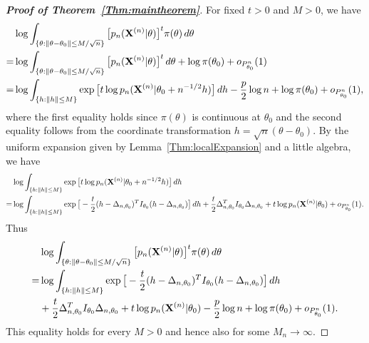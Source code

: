 \documentclass[11pt]{article}
\theoremstyle{plain}
\theoremstyle{definition}
\theoremstyle{remark}
\begin{document}
\begin{appendices}
    \begin{proof}[\textbf{Proof of Theorem~\ref{Thm:maintheorem}}]
        For fixed $t>0$ and $M>0$, we have
\begin{align*}
    &\log \int_{\{\theta:\|\theta-\theta_0\|\leq M/\sqrt{n}\}}\big[ p_n(\mathbf{X}^{(n)}|\theta)\big]^t \pi(\theta)\, d\theta\\
    =
    &\log \int_{\{\theta:\|\theta-\theta_0\|\leq M/\sqrt{n}\}}\big[ p_n(\mathbf{X}^{(n)}|\theta)\big]^t \, d\theta+\log \pi(\theta_0)+o_{P^n_{\theta_0}}(1)\\
    =
    &\log \int_{\{h:\|h\|\leq M\}}\exp\big[ t\log p_n(\mathbf{X}^{(n)}|\theta_0+n^{-1/2}h)\big] \, dh-\frac{p}{2}\log n+\log \pi(\theta_0)+o_{P^n_{\theta_0}}(1),
\end{align*}
where the first equality holds since $\pi(\theta)$ is continuous at $\theta_0$ and the second equality follows from the coordinate transformation $h=\sqrt{n}(\theta-\theta_0)$.
By the uniform expansion given by Lemma~\ref{Thm:localExpansion} and a little algebra, we have
\begin{align*}
    &\log \int_{\{h:\|h\|\leq M\}}\exp\big[ t\log p_n(\mathbf{X}^{(n)}|\theta_0+n^{-1/2}h)\big] \, dh\\
    =&\log \int_{\{h:\|h\|\leq M\}}\exp\big[ -\frac{t}{2}(h-\Delta_{n,\theta_0})^T I_{\theta_0}(h-\Delta_{n,\theta_0})\big] \, dh
    +
    \frac{t}{2}\Delta_{n,\theta_0}^T I_{\theta_0}\Delta_{n,\theta_0}
    +
    t\log p_n(\mathbf{X}^{(n)}|\theta_0)
    +o_{P_{\theta_0}^n}(1).
\end{align*}
        Thus
\begin{align*}
    &\log \int_{\{\theta:\|\theta-\theta_0\|\leq M/\sqrt{n}\}}\big[ p_n(\mathbf{X}^{(n)}|\theta)\big]^t \pi(\theta)\, d\theta\\
    =
    &\log \int_{\{h:\|h\|\leq M\}}\exp\big[ -\frac{t}{2}(h-\Delta_{n,\theta_0})^T I_{\theta_0}(h-\Delta_{n,\theta_0})\big] \, dh
    \\
    & +
    \frac{t}{2}\Delta_{n,\theta_0}^T I_{\theta_0}\Delta_{n,\theta_0}
    +
    t\log p_n(\mathbf{X}^{(n)}|\theta_0)
    -\frac{p}{2}\log n+\log \pi(\theta_0)+o_{P^n_{\theta_0}}(1).
\end{align*}
This equality holds for every $M>0$ and hence also for some $M_n\to \infty$.

\end{proof}
\end{appendices}
\end{document}
